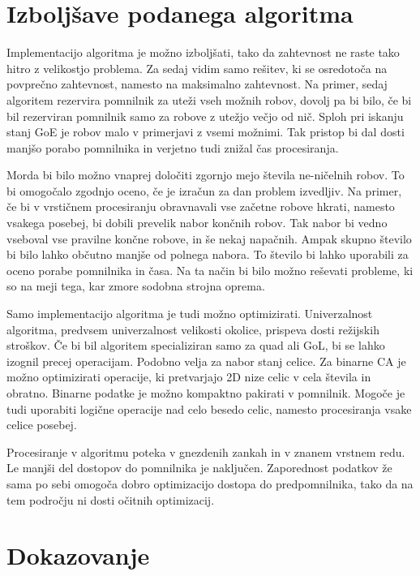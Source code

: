 \documentclass[12pt,a4paper,openany,twoside]{book}
\begin{document}
\section{Izboljšave podanega algoritma}

Implementacijo algoritma je možno izboljšati, tako da zahtevnost
ne raste tako hitro z velikostjo problema.
Za sedaj vidim samo rešitev, ki se osredotoča na povprečno zahtevnost, namesto na maksimalno zahtevnost.
Na primer, sedaj algoritem rezervira pomnilnik za uteži vseh možnih robov,
dovolj pa bi bilo, če bi bil rezerviran pomnilnik samo za robove z utežjo večjo od nič.
Sploh pri iskanju stanj GoE je robov malo v primerjavi z vsemi možnimi.
Tak pristop bi dal dosti manjšo porabo pomnilnika
in verjetno tudi znižal čas procesiranja.

Morda bi bilo možno vnaprej določiti zgornjo mejo števila ne-ničelnih robov.
To bi omogočalo zgodnjo oceno, če je izračun za dan problem izvedljiv.
Na primer, če bi v vrstičnem procesiranju obravnavali vse začetne robove hkrati,
namesto vsakega posebej, bi dobili prevelik nabor končnih robov.
Tak nabor bi vedno vseboval vse pravilne končne robove, in še nekaj napačnih.
Ampak skupno število bi bilo lahko občutno manjše od polnega nabora.
To število bi lahko uporabili za oceno porabe pomnilnika in časa.
Na ta način bi bilo možno reševati probleme, ki so na meji tega,
kar zmore sodobna strojna oprema.

Samo implementacijo algoritma je tudi možno optimizirati.
Univerzalnost algoritma, predvsem univerzalnost velikosti okolice,
prispeva dosti režijskih stroškov. Če bi bil algoritem specializiran
samo za quad ali GoL, bi se lahko izognil precej operacijam.
Podobno velja za nabor stanj celice. Za binarne CA je možno optimizirati
operacije, ki pretvarjajo 2D nize celic v cela števila in obratno.
Binarne podatke je možno kompaktno pakirati v pomnilnik.
Mogoče je tudi uporabiti logične operacije nad celo besedo celic,
namesto procesiranja vsake celice posebej.

Procesiranje v algoritmu poteka v gnezdenih zankah in v znanem vrstnem redu.
Le manjši del dostopov do pomnilnika je naključen.
Zaporednost podatkov že sama po sebi omogoča dobro optimizacijo dostopa do predpomnilnika,
tako da na tem področju ni dosti očitnih optimizacij.

\section{Dokazovanje}
\end{document}
